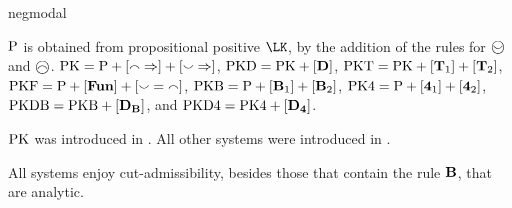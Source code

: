 \begin{entry}{negmodal}
\begin{calculus}
\end{calculus}


 \begin{clarifications}
 ${\rm {P}}$ is obtained from propositional positive $\LK$,
 by the addition of the rules for $\wsmile$ and $\wfrown$.
 {${\rm {PK}}={\rm {P}}+[{\smallfrown}\Rightarrow]+[{\smallsmile}\Rightarrow]$,}
 {${\rm {PKD}}={\rm {PK}}+[{\bf D}]$,}
 {${\rm {PKT}}={\rm {PK}}+[{\bf T}_{1}]+[{\bf T}_{2}]$,}
 {${\rm {PKF}}={\rm {P}}+[{\bf Fun}]+[{\smallsmile}={\smallfrown}]$,}
 {${\rm {PKB}}={\rm {P}}+[{\bf B}_{1}]+[{\bf B}_{2}]$,}
 {${\rm {PK4}}={\rm {P}}+[{\bf 4}_{1}]+[{\bf 4}_{2}]$,}
 {${\rm {PKDB}}={\rm {PKB}}+[{\bf D}_{{\bf B}}]$,} and
 {${\rm {PKD4}}={\rm {PK4}}+[{\bf D}_{{\bf 4}}]$.}

 \end{clarifications}

 \begin{history}
${\rm {PK}}$ was introduced in \cite{dod:mar:ENTCS2013}. All other systems were introduced in \cite{lahav_it_2016}.
 \end{history}

 \begin{technicalities}
All systems enjoy cut-admissibility, besides
those that contain the rule ${\bf B}$, that are analytic.
 \end{technicalities}



\end{entry}
